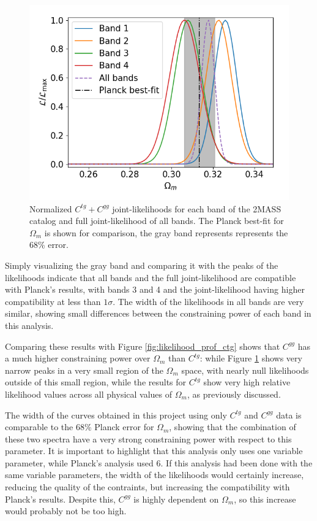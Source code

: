 \documentclass[openany,a4paper,12pt,oneside]{book}
\begin{document}
\begin{spacing}{1.5}
\begin{figure}[!htb]
	\centering
	\includegraphics[width=.7\linewidth]{Imagens/profile_allbands_Nmc2e7.png}
	\caption{Normalized $C^{tg}+C^{gg}$ joint-likelihoods for each band of the 2MASS catalog and full joint-likelihood of all bands. The Planck best-fit for $\Omega_m$ is shown for comparison, the gray band represents represents the 68\% error.}
	\label{fig:likelihood_prof_ctg+cgg}
\end{figure}

Simply visualizing the gray band and comparing it with the peaks of the likelihoods indicate that all bands and the full joint-likelihood are compatible with Planck's results, with bands 3 and 4 and the joint-likelihood having higher compatibility at less than $1\sigma$. The width of the likelihoods in all bands are very similar, showing small differences between the constraining power of each band in this analysis. 

Comparing these results with Figure \ref{fig:likelihood_prof_ctg} shows that $C^{gg}$ has a much higher constraining power over $\Omega_m$ than $C^{tg}$: while Figure \ref{fig:likelihood_prof_ctg+cgg} shows very narrow peaks in a very small region of the $\Omega_m$ space, with nearly null likelihoods outside of this small region, while the results for $C^{tg}$ show very high relative likelihood values across all physical values of $\Omega_m$, as previously discussed.

The width of the curves obtained in this project using only $C^{tg}$ and $C^{gg}$ data is comparable to the 68\% Planck error for $\Omega_m$, showing that the combination of these two spectra have a very strong constraining power with respect to this parameter. It is important to highlight that this analysis only uses one variable parameter, while Planck's analysis used 6. If this analysis had been done with the same variable parameters, the width of the likelihoods would certainly increase, reducing the quality of the contraints, but increasing the compatibility with Planck's results. Despite this, $C^{gg}$ is highly dependent on $\Omega_m$, so this increase would probably not be too high.


\end{spacing}
\end{document}
